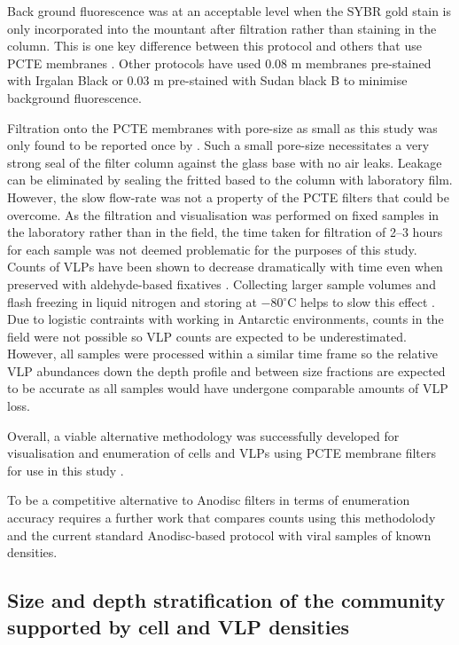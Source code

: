 Back ground fluorescence was at an acceptable level when the SYBR gold stain is only incorporated into the mountant after filtration rather than staining in the column.
This is one key difference between this protocol and others that use \ac{PCTE} membranes \cite{Hara1991, Proctor1992, Diemer2012}.
Other protocols have used 0.08 \textmu{}m membranes pre-stained with Irgalan Black \cite{Proctor1992} or 0.03 \textmu{}m pre-stained with Sudan black B \cite{Diemer2012} to minimise background fluorescence.

Filtration onto the \ac{PCTE} membranes with pore-size as small as this study was only found to be reported once by \citet{Hara1991}.
Such a small pore-size necessitates a very strong seal of the filter column against the glass base with no air leaks.
Leakage can be eliminated by sealing the fritted based to the column with laboratory film. 
However, the slow flow-rate was not a property of the \ac{PCTE} filters that could be overcome.
As the filtration and visualisation was performed on fixed samples in the laboratory rather than in the field, the time taken for filtration of 2--3 hours for each sample was not deemed problematic for the purposes of this study.
Counts of \acp{VLP} have been shown to decrease dramatically with time even when preserved with aldehyde-based fixatives \cite{Wen2004}.
Collecting larger sample volumes and flash freezing in liquid nitrogen and storing at $-$80$^{\circ}$C helps to slow this effect \cite{Patel2007}.
Due to logistic contraints with working in Antarctic environments, counts in the field were not possible so \ac{VLP} counts are expected to be underestimated.
However, all samples were processed within a similar time frame so the relative \ac{VLP} abundances down the depth profile and between size fractions are expected to be accurate as all samples would have undergone comparable amounts of \ac{VLP} loss. 

Overall, a viable alternative methodology was successfully developed for visualisation and enumeration of cells and \acp{VLP} using \ac{PCTE} membrane filters for use in this study .

To be a competitive alternative to Anodisc filters in terms of enumeration accuracy requires a further work that compares counts using this methodolody and the current standard Anodisc-based protocol \cite{Patel2007} with viral samples of known densities.

\subsection[Community stratification supported by cell and \ac{VLP} densities]{Size and depth stratification of the community supported by cell and \ac{VLP} densities}

